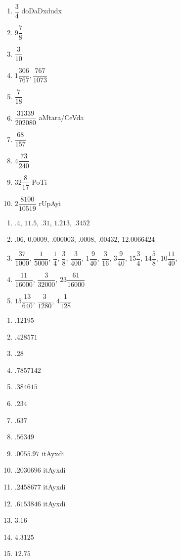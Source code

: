 
\begin{multicols}{3}
\begin{enumerate}[$(1)$]
\item $\dfrac{3}{4}$ doDaDxdudx 
\item $9 \dfrac{7}{8}$ 
\item $\dfrac{3}{10}$ 
\item $1\dfrac{306}{767}, \dfrac{767}{1073}$
\item $\dfrac{7}{18}$ 
\item $\dfrac{31339}{202080}$ aMtara/CeVda 
\item $\dfrac{68}{157}$ 
\item $4 \dfrac{73}{240}$
\item $32 \dfrac{8}{17}$ PoTi 
\item $2 \dfrac{8100}{10519}$ rUpAyi
\end{enumerate}
\end{multicols}


\begin{enumerate}[$(1)$]
\item $.4$, $11.5$, $.31$, $1.213$, $.3452$
\item $.06$, $0.0009$, $.000003$, $.0008$, $.00432$, $12.0066424$
\item $\dfrac{37}{1000}$, $\dfrac{1}{5000}$, $\dfrac{1}{4}$,
$\dfrac{3}{8}$, $\dfrac{3}{400}$, $1 \dfrac{9}{40}$, $\dfrac{3}{16}$,
$3 \dfrac{9}{40}$, $15\dfrac{3}{4}$, $14\dfrac{5}{8}$,
$10 \dfrac{11}{40}$,
\item $\dfrac{11}{16000}$, $\dfrac{3}{32000}$, $23 \dfrac{61}{16000}$
\item $15\dfrac{13}{640}$, $\dfrac{3}{1280}$, $4\dfrac{1}{128}$
\end{enumerate}


\begin{multicols}{3}
\begin{enumerate}[$(1)$]
\item $.12195$
\item $.428571$
\item $.28$
\item $.7857142$
\item $.384615$
\item $.234$
\item $.637$
\item $.56349$
\item $.0055.97$ itAyxdi
\item $.2030696$ itAyxdi
\item $.2458677$ itAyxdi
\item $.6153846$ itAyxdi
\item $3.16$
\item $4.3125$
\item $12.75$
\end{enumerate}
\end{multicols}

